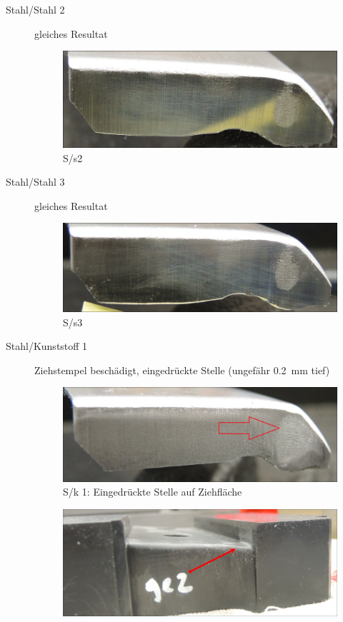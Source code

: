 \documentclass[12pt,a4paper,parskip,twoside,BCOR5mm,headsepline]{scrartcl}
\begin{document}
\begin{description*}
\begin{description}
\item[Stahl/Stahl 2]gleiches Resultat
\begin{figure}[H]
\centering
\includegraphics[width=.8\textwidth]{Ss2}
\caption{S/s2}
\label{fig:ss2}
\end{figure}
\item[Stahl/Stahl 3] gleiches Resultat
\begin{figure}[H]
\centering
\includegraphics[width=.8\textwidth]{Ss3}
\caption{S/s3}
\label{fig:ss3}
\end{figure}
\item[Stahl/Kunststoff 1] Ziehstempel beschädigt, eingedrückte Stelle (ungefähr \SI{0.2}{\milli\meter} tief)
\begin{figure}[H]
\centering
\includegraphics[width=.8\textwidth]{Sk1}
\caption{S/k 1: Eingedrückte Stelle auf Ziehfläche}
\label{fig:sk1}
\end{figure}
\begin{figure}[H]
\centering
\includegraphics[width=.8\textwidth]{PunchDefektGut}

\end{figure}
\end{description}
\end{description*}
\end{document}
